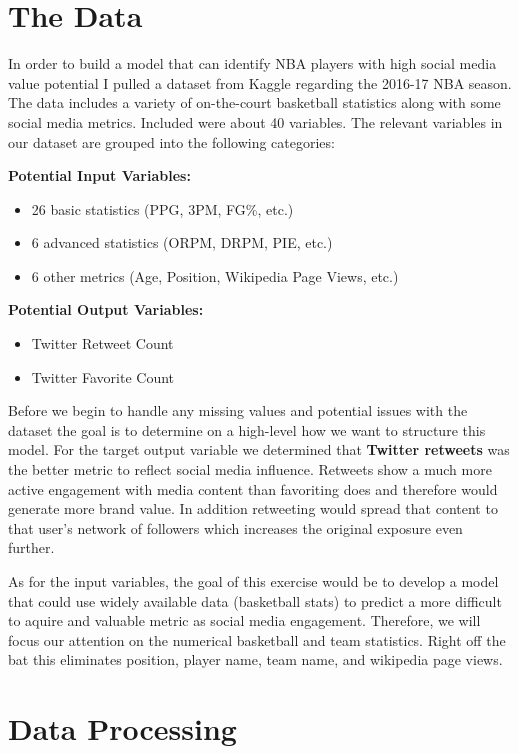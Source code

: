 \documentclass[11pt]{article}
\providecommand{\tightlist}{%
      \setlength{\itemsep}{0pt}\setlength{\parskip}{0pt}}
\begin{document}
    \section{The Data}\label{the-data}

    In order to build a model that can identify NBA players with high social
media value potential I pulled a dataset from Kaggle regarding the
2016-17 NBA season. The data includes a variety of on-the-court
basketball statistics along with some social media metrics. Included
were about 40 variables. The relevant variables in our dataset are grouped into the following
categories:


\textbf{Potential Input Variables:}
\begin{itemize}
\tightlist
\item 26 basic statistics (PPG, 3PM, FG\%, etc.)
\item  6 advanced statistics (ORPM, DRPM, PIE, etc.)
\item  6 other metrics (Age, Position, Wikipedia Page Views, etc.)
\end{itemize}

\textbf{Potential Output Variables:}
\begin{itemize}
\tightlist
\item Twitter Retweet Count
\item Twitter Favorite Count
\end{itemize}

Before we begin to handle any missing values and potential issues with
the dataset the goal is to determine on a high-level how we want to
structure this model. For the target output variable we determined that
\textbf{Twitter retweets} was the better metric to reflect social media
influence. Retweets show a much more active engagement with media
content than favoriting does and therefore would generate more brand
value. In addition retweeting would spread that content to that user's
network of followers which increases the original exposure even further.

As for the input variables, the goal of this exercise would be to
develop a model that could use widely available data (basketball stats)
to predict a more difficult to aquire and valuable metric as social
media engagement. Therefore, we will focus our attention on the
numerical basketball and team statistics. Right off the bat this
eliminates position, player name, team name, and wikipedia page views.

    \section{Data Processing}\label{data-processing}
\end{document}
